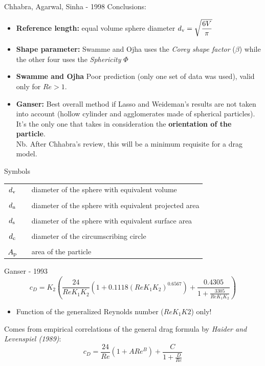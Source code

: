 \documentclass[11pt]{beamer}
\begin{document}
	\begin{frame}{Chhabra, Agarwal, Sinha - 1998}
		Conclusions:
		\begin{itemize}
			\item \textbf{Reference length:} equal volume sphere diameter $ d_{\textup{v}} = \sqrt{\dfrac{6 V}{\pi}} $
			\item \textbf{Shape parameter:} Swamme and Ojha uses the \textit{Corey shape factor} ($ \beta $) while the other four uses the \textit{Sphericity} $ \Phi $
			\item \textbf{Swamme and Ojha} Poor prediction (only one set of data was used), valid only for $ Re > 1 $.
			\item \textbf{Ganser:} Best overall method if Lasso and Weideman's results are not taken into account (hollow cylinder and agglomerates made of spherical particles). It's the only one that takes in consideration the \textbf{orientation of the particle}.\\
			Nb. After Chhabra's review, this will be a minimum requisite for a drag model.
		\end{itemize}
	\end{frame}

	\begin{frame}{Symbols}
		\begin{tabular}{ccl}
			$ d_{\textup{v}} $ & & diameter of the sphere with equivalent volume \\
			\\
			$ d_{\textup{n}} $ & & diameter of the sphere with equivalent projected area\\
			\\
			$ d_{\textup{s}} $ & & diameter of the sphere with equivalent surface area\\
			\\
			$ d_{\textup{c}} $ & & diameter of the circumscribing circle\\
			\\
			$ A_{\textup{p}} $ & & area of the particle
		\end{tabular}
	\end{frame}

	\begin{frame}{Ganser - 1993}
		\begin{equation*}
		c_D = K_2 \left( \frac{24}{Re K_1 K_2} (1 + 0.1118 (Re K_1 K_2)^{0.6567}) + \frac{0.4305}{1 + \frac{3305}{Re K_1 K_2}}\right) 
		\end{equation*}
		\begin{itemize}
			\item Function of the generalized Reynolds number ($ Re K_1 K2 $) only!
		\end{itemize}
		\vfill
		Comes from empirical correlations of the general drag formula by \textit{Haider and Levenspiel (1989)}:
		\begin{equation*}
		c_D = \frac{24}{Re} (1 + A Re^B) + \dfrac{C}{1 + \frac{D}{Re}}
		\end{equation*}
	\end{frame}
	
\end{document}
